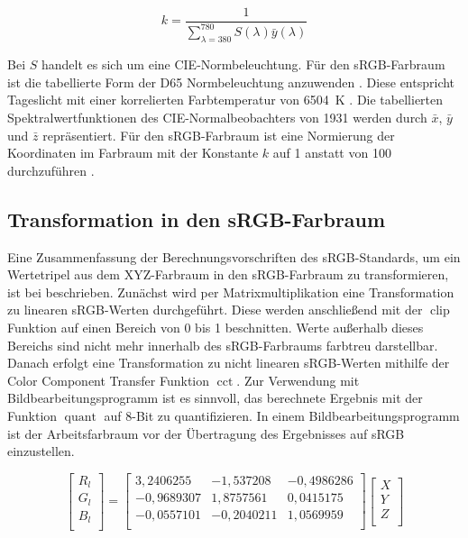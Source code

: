 \documentclass[10pt,a4paper,DIV=12,parskip=half]{scrarticle}
\begin{document}
\begin{equation*}
	k = \frac{1}{\sum_{\lambda=380}^{780} S(\lambda) \bar{y}(\lambda)}
\end{equation*}

Bei $S$ handelt es sich um eine CIE-Normbeleuchtung. Für den sRGB-Farbraum ist die tabellierte Form der D65 Normbeleuchtung anzuwenden \parencites{W3C2015}{CIE2022}. Diese entspricht Tageslicht mit einer korrelierten Farbtemperatur von 6504~K \parencite{ASTM2022}. Die tabellierten Spektralwertfunktionen des CIE-Normalbeobachters von 1931 \parencite{CIE2018} werden durch $\bar{x}$, $\bar{y}$ und $\bar{z}$ repräsentiert. Für den sRGB-Farbraum ist eine Normierung der Koordinaten im Farbraum mit der Konstante $k$ auf 1 anstatt von 100 durchzuführen \parencite{W3C2015}.

\subsection*{Transformation in den sRGB-Farbraum}

Eine Zusammenfassung der Berechnungsvorschriften des sRGB-Standards, um ein Wertetripel aus dem XYZ-Farbraum in den sRGB-Farbraum zu transformieren, ist bei \cite{W3C2015} beschrieben. Zunächst wird per Matrixmultiplikation eine Transformation zu linearen sRGB-Werten durchgeführt. Diese werden anschließend mit der $\operatorname{clip}$ Funktion auf einen Bereich von 0 bis 1 beschnitten. Werte außerhalb dieses Bereichs sind nicht mehr innerhalb des sRGB-Farbraums farbtreu darstellbar. Danach erfolgt eine Transformation zu nicht linearen sRGB-Werten mithilfe der Color Component Transfer Funktion $\operatorname{cct}$. Zur Verwendung mit Bildbearbeitungsprogramm ist es sinnvoll, das berechnete Ergebnis mit der Funktion $\operatorname{quant}$ auf 8-Bit zu quantifizieren. In einem Bildbearbeitungsprogramm ist der Arbeitsfarbraum vor der Übertragung des Ergebnisses auf sRGB einzustellen.

\begin{equation*}
\begin{bmatrix}
R_{l} \\
G_{l} \\
B_{l} \\
\end{bmatrix} =
\begin{bmatrix}
3,2406255 & -1,537208 & -0,4986286 \\
-0,9689307 & 1,8757561 & 0,0415175 \\
-0,0557101 & -0,2040211 & 1,0569959 \\
\end{bmatrix}
\begin{bmatrix}
X \\
Y \\
Z \\
\end{bmatrix}
\end{equation*}
\end{document}
